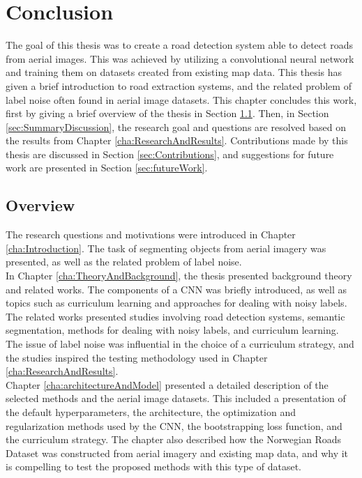 \documentclass[a4paper]{book}
\begin{document}
\chapter{Conclusion}
\label{cha:evaluationAndConclusion}
The goal of this thesis was to create a road detection system able to detect roads from aerial images. This was achieved by utilizing a convolutional neural network and training them on datasets created from existing map data. This thesis has given a brief introduction to road extraction systems, and the related problem of label noise often found in aerial image datasets. This chapter concludes this work, first by giving a brief overview of the thesis in Section \ref{sec:summaryOverview}. Then, in Section \ref{sec:SummaryDiscussion}, the research goal and questions are resolved based on the results from Chapter \ref{cha:ResearchAndResults}. Contributions made by this thesis are discussed in Section \ref{sec:Contributions}, and suggestions for future work are presented in Section \ref{sec:futureWork}.\\

\section{Overview}
\label{sec:summaryOverview}
The research questions and motivations were introduced in Chapter \ref{cha:Introduction}. The task of segmenting objects from aerial imagery was presented, as well as the related problem of label noise. \\

In Chapter \ref{cha:TheoryAndBackground}, the thesis presented background theory and related works. The components of a \ac{CNN} was briefly introduced, as well as topics such as curriculum learning and approaches for dealing with noisy labels. The related works presented studies involving road detection systems, semantic segmentation, methods for dealing with noisy labels, and curriculum learning. The issue of label noise was influential in the choice of a curriculum strategy, and the studies inspired the testing methodology used in Chapter \ref{cha:ResearchAndResults}.\\

Chapter \ref{cha:architectureAndModel} presented a detailed description of the selected methods and the aerial image datasets. This included a presentation of the default hyperparameters, the architecture, the optimization and regularization methods used by the \ac{CNN}, the bootstrapping loss function, and the curriculum strategy. The chapter also described how the Norwegian Roads Dataset was constructed from aerial imagery and existing map data, and why it is compelling to test the proposed methods with this type of dataset.\\
\end{document}
